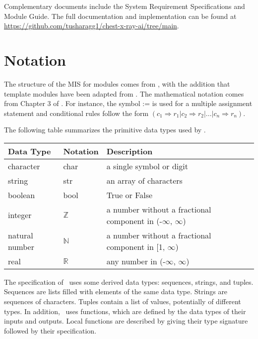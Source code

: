 \documentclass[12pt, titlepage]{article}
\begin{document}
Complementary documents include the System Requirement Specifications and
Module Guide. The full documentation and implementation can be found at
\url{https://github.com/tusharagg1/chest-x-ray-ai/tree/main}.

\section{Notation}


The structure of the MIS for modules comes from \citet{HoffmanAndStrooper1995},
with the addition that template modules have been adapted from
\cite{GhezziEtAl2003}.  The mathematical notation comes from Chapter 3 of
\citet{HoffmanAndStrooper1995}.  For instance, the symbol := is used for a
multiple assignment statement and conditional rules follow the form $(c_1
\Rightarrow r_1 | c_2 \Rightarrow r_2 | ... | c_n \Rightarrow r_n )$.

The following table summarizes the primitive data types used by \progname. 

\begin{center}
\renewcommand{\arraystretch}{1.2}
\noindent 
\begin{tabular}{l l p{7.5cm}} 
\toprule 
\textbf{Data Type} & \textbf{Notation} & \textbf{Description}\\ 
\midrule
character & char & a single symbol or digit\\
string & str & an array of characters \\
boolean & bool & True or False \\
integer & $\mathbb{Z}$ & a number without a fractional component in (-$\infty$, $\infty$) \\
natural number & $\mathbb{N}$ & a number without a fractional component in [1, $\infty$) \\
real & $\mathbb{R}$ & any number in (-$\infty$, $\infty$)\\
\bottomrule
\end{tabular} 
\end{center}

\noindent
The specification of \progname \ uses some derived data types: sequences, strings, and
tuples. Sequences are lists filled with elements of the same data type. Strings
are sequences of characters. Tuples contain a list of values, potentially of
different types. In addition, \progname \ uses functions, which
are defined by the data types of their inputs and outputs. Local functions are
described by giving their type signature followed by their specification.
\end{document}
